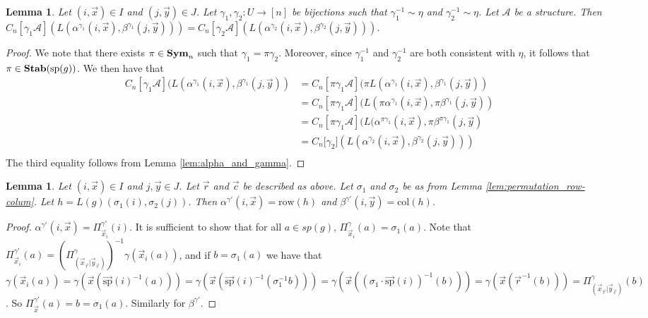 \documentclass[12pt]{report}
\newtheorem{lem}[thm]{Lemma} \newtheorem{prop}[thm]{Proposition}
\newcommand{\stab}{\text{\textbf{Stab}}}
\newcommand{\sym}{\text{\textbf{Sym}}}
\newcommand{\consp}{\text{sp}}
\newcommand{\row}{\text{row}}
\newcommand{\column}{\text{col}}
\newcommand{\spstab}[1]{\stab (\consp (#1))}
\begin{document}
\begin{lem}
  \label{lem:alpha_ind_gamma}
  Let $(i,\vec{x}) \in I$ and $(j, \vec{y}) \in J$. Let $\gamma_1, \gamma_2: U
  \rightarrow [n]$ be bijections such that $\gamma^{-1}_1 \sim \eta$ and
  $\gamma^{-1}_2 \sim \eta$. Let $\mathcal{A}$ be a structure. Then
  $C_n[\gamma_1 \mathcal{A}] (L(\alpha^{\gamma_1}(i, \vec{x}),
  \beta^{\gamma_1}(j, \vec{y}))) = C_n[\gamma_2 \mathcal{A}]
  (L(\alpha^{\gamma_2}(i, \vec{x}), \beta^{\gamma_2}(j, \vec{y})))$.
\end{lem}
\begin{proof}
  We note that there exists $\pi \in \sym_n$ such that $\gamma_1 = \pi
  \gamma_2$. Moreover, since $\gamma^{-1}_1$ and $\gamma^{-1}_2$ are both
  consistent with $\eta$, it follows that $\pi \in \spstab{g}$. We then have
  that
  \begin{align*}
    C_n[\gamma_1 \mathcal{A}](L(\alpha^{\gamma_1}(i, \vec{x}), \beta^{\gamma_1}(j,
    \vec{y})) &= C_n[\pi \gamma_1 \mathcal{A}](\pi L(\alpha^{\gamma_1}(i, \vec{x}),
                \beta^{\gamma_1}(j, \vec{y})) \\
              &= C_n[\pi \gamma_1 \mathcal{A}](L(\pi
                \alpha^{\gamma_1}(i, \vec{x}), \pi \beta^{\gamma_1}(j, \vec{y}))\\
              &= C_n[\pi
                \gamma_1 \mathcal{A}](L(\alpha^{\pi \gamma_1}(i, \vec{x}), \pi \beta^{\pi
                \gamma_1}(j, \vec{y})\\
              &= C_n[\gamma_2 \mathcal] (L(\alpha^{\gamma_2}(i,
                \vec{x}), \beta^{\gamma_2}(j, \vec{y})))\\
  \end{align*}The third equality follows from Lemma \ref{lem:alpha_and_gamma}.
\end{proof}

\begin{lem}
  \label{lem:defining_h_from_IJ}
  Let $(i, \vec{x}) \in I$ and $j, \vec{y} \in J$. Let $\vec{r}$ and $\vec{c}$
  be described as above. Let $\sigma_1$ and $\sigma_2$ be as from Lemma
  \ref{lem:permutation_row-colum}. Let $h = L(g) (\sigma_1 (i), \sigma_2 (j))$.
  Then $\alpha^{\gamma'} (i, \vec{x}) = \row (h)$ and $\beta^{\gamma'}
  (i,\vec{y}) = \column(h)$.
\end{lem}
\begin{proof}
  $\alpha^{\gamma'}(i, \vec{x}) = \Pi^{\gamma'}_{\vec{x}_i} (i)$. It is
  sufficient to show that for all $a \in sp(g)$, $\Pi^{\gamma}_{\vec{x}_i} (a) =
  \sigma_1 (a)$. Note that $\Pi^{\gamma'}_{\vec{x}_i} (a) =
  (\Pi^{\gamma}_{(\vec{x}_{\vec{r}} \vert \vec{y}_{\vec{c}})})^{-1} \gamma
  (\vec{x}_i (a))$, and if $b = \sigma_1 (a)$ we have that $\gamma (\vec{x}_i
  (a)) = \gamma (\vec{x} (\vec{\consp}(i)^{-1} (a))) = \gamma (\vec{x}
  (\vec{\consp}(i)^{-1} (\sigma^{-1}_1 b))) = \gamma (\vec{x} ((\sigma_1 \cdot
  \vec{\consp}(i))^{-1} (b))) = \gamma (\vec{x} (\vec{r}^{-1}(b))) =
  \Pi^{\gamma}_{(\vec{x}_{\vec{r}} \vert \vec{y}_{\vec{c}})}(b)$. So
  $\Pi^{\gamma'}_{\vec{x}} (a) = b = \sigma_1 (a)$. Similarly for
  $\beta^{\gamma'}$.
\end{proof}
\end{document}
